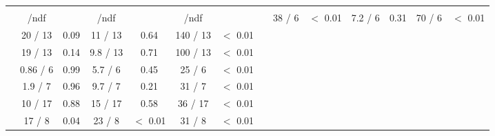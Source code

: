 \begin{table}
\begin{tabular}{ccccccc}
		&	  & 	  & 	 \multicolumn{2}{c}{\mgamcMLMpythia} \\ 
		\vspace*{0.02cm} &	\chis/ndf & \pvalue &	\chis/ndf & \pvalue &	\chis/ndf & \pvalue &			\hline
		\vspace*{0.02cm} \NJET &	38 / 6 &	 $<$ 0.01 &	7.2 / 6 &	 0.31 &	70 / 6 &	 $<$ 0.01 \\
		\vspace*{0.02cm} \HT &	20 / 13 &	 0.09 &	11 / 13 &	 0.64 &	140 / 13 &	 $<$ 0.01 \\
		\vspace*{0.02cm} \ST &	19 / 13 &	 0.14 &	9.8 / 13 &	 0.71 &	100 / 13 &	 $<$ 0.01 \\
		\vspace*{0.02cm} \ptmiss &	0.86 / 6 &	 0.99 &	5.7 / 6 &	 0.45 &	25 / 6 &	 $<$ 0.01 \\
		\vspace*{0.02cm} \WPT &	1.9 / 7 &	 0.96 &	9.7 / 7 &	 0.21 &	31 / 7 &	 $<$ 0.01 \\
		\vspace*{0.02cm} \LPT &	10 / 17 &	 0.88 &	15 / 17 &	 0.58 &	36 / 17 &	 $<$ 0.01 \\
		\vspace*{0.02cm} \LETA &	17 / 8 &	 0.04 &	23 / 8 &	 $<$ 0.01 &	31 / 8 &	 $<$ 0.01 \\
	\end{tabular}
\end{table}
